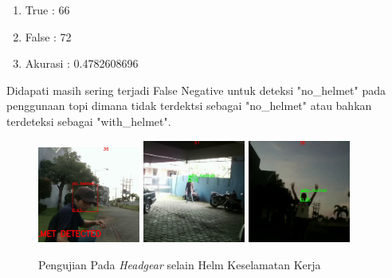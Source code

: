 \begin{enumerate}[nolistsep]
  \item True : 66
  \item False : 72
  \item Akurasi : 0.4782608696
\end{enumerate}

Didapati masih sering terjadi False Negative untuk deteksi "no\_helmet" pada penggunaan topi dimana tidak terdektsi sebagai "no\_helmet" atau bahkan terdeteksi sebagai "with\_helmet".

\begin{figure} [h!]
  \centering
  \includegraphics[width=0.3\textwidth]{gambar/pengujian/Screenshot_105.png}
  \includegraphics[width=0.3\textwidth]{gambar/pengujian/Screenshot_106.png}
  \includegraphics[width=0.3\textwidth]{gambar/pengujian/Screenshot_107.png}
  \caption{Pengujian Pada \emph{Headgear} selain Helm Keselamatan Kerja}
  \label{fig:pengujian_headgear}  
\end{figure}


